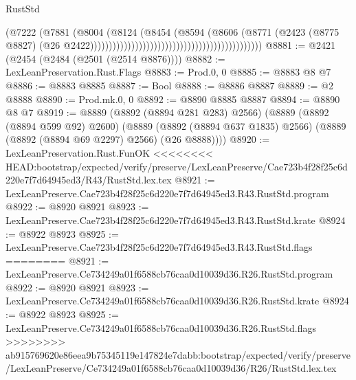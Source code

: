 \begin{lexlean}{RustStd}
\begin{coremodule}
{\begin{coremodule}
{{{{{{{{{{{{{{{{{{{{{{{{{{{{{{{{{{{{{{{                                                                            (@7222
                                                                              (@7881
                                                                                (@8004
                                                                                  (@8124
                                                                                    (@8454
                                                                                      (@8594
                                                                                        (@8606
                                                                                          (@8771
                                                                                            (@2423
                                                                                              (@8775
                                                                                                @8827)
                                                                                              (@26
                                                                                                @2422))))))))))))))))))))))))))))))))))))))))))))))
@8881 := @2421 (@2454 (@2484 (@2501 (@2514 @8876))))
@8882 := LexLeanPreservation.Rust.Flags
@8883 := Prod.{0, 0}
@8885 := @8883 @8 @7
@8886 := @8883 @8885
@8887 := Bool
@8888 := @8886 @8887
@8889 := @2 @8888
@8890 := Prod.mk.{0, 0}
@8892 := @8890 @8885 @8887
@8894 := @8890 @8 @7
@8919 := @8889
    (@8892 (@8894 @281 @283) @2566)
    (@8889
      (@8892 (@8894 @599 @92) @2600)
      (@8889 (@8892 (@8894 @637 @1835) @2566) (@8889 (@8892 (@8894 @69 @2297) @2566) (@26 @8888))))
@8920 := LexLeanPreservation.Rust.FunOK
<<<<<<<< HEAD:bootstrap/expected/verify/preserve/LexLeanPreserve/Cae723b4f28f25c6d220e7f7d64945ed3/R43/RustStd.lex.tex
@8921 := LexLeanPreserve.Cae723b4f28f25c6d220e7f7d64945ed3.R43.RustStd.program
@8922 := @8920 @8921
@8923 := LexLeanPreserve.Cae723b4f28f25c6d220e7f7d64945ed3.R43.RustStd.krate
@8924 := @8922 @8923
@8925 := LexLeanPreserve.Cae723b4f28f25c6d220e7f7d64945ed3.R43.RustStd.flags
========
@8921 := LexLeanPreserve.Ce734249a01f6588cb76caa0d10039d36.R26.RustStd.program
@8922 := @8920 @8921
@8923 := LexLeanPreserve.Ce734249a01f6588cb76caa0d10039d36.R26.RustStd.krate
@8924 := @8922 @8923
@8925 := LexLeanPreserve.Ce734249a01f6588cb76caa0d10039d36.R26.RustStd.flags
>>>>>>>> ab915769620e86eea9b75345119e147824e7dabb:bootstrap/expected/verify/preserve/LexLeanPreserve/Ce734249a01f6588cb76caa0d10039d36/R26/RustStd.lex.tex
}}}}}}}}}}}}}}}}}}}}}}}}}}}}}}}}}}}}}}}
\end{coremodule}}
\end{coremodule}
\end{lexlean}
